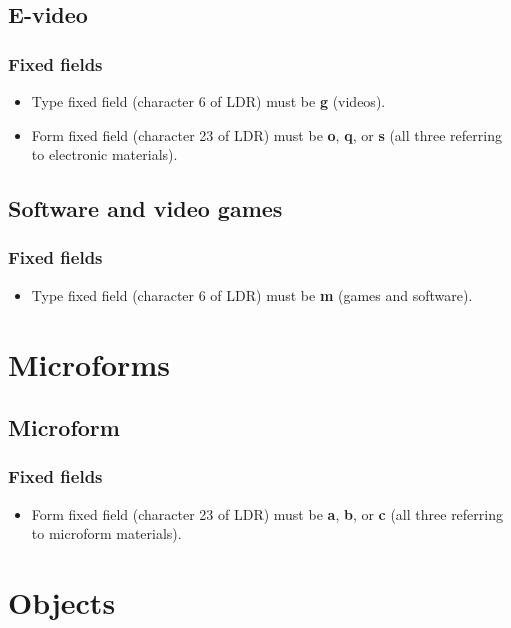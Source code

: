 \documentclass[a4paper,10pt]{amsart}
\let\stdsection\section
\renewcommand\section{\newpage\stdsection}
\begin{document}
\subsection{E-video}
\subsubsection*{Fixed fields}
\begin{itemize}
 \item Type fixed field (character 6 of LDR) must be {\bf g} (videos).
 \item Form fixed field (character 23 of LDR) must be {\bf o}, {\bf q}, or {\bf s} (all three referring to electronic materials).
\end{itemize}

\subsection{Software and video games}
\subsubsection*{Fixed fields}
\begin{itemize}
 \item Type fixed field (character 6 of LDR) must be {\bf m} (games and software).
\end{itemize}




\section{Microforms}
\subsection{Microform}
\subsubsection*{Fixed fields}
\begin{itemize}
 \item Form fixed field (character 23 of LDR) must be {\bf a}, {\bf b}, or {\bf c} (all three referring to microform materials).
\end{itemize}



\section{Objects}
\end{document}
